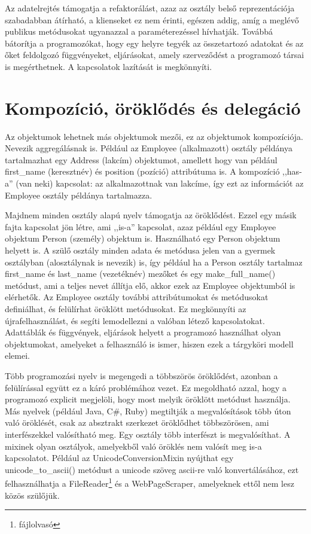 \documentclass[a4paper,12pt,twoside]{report}
\theoremstyle{definition}
\begin{document}
	Az adatelrejtés támogatja a refaktorálást, azaz az osztály belső reprezentációja szabadabban átírható, a klienseket ez nem érinti, egészen addig, amíg a meglévő publikus metódusokat ugyanazzal a paraméterezéssel hívhatják. Továbbá bátorítja a programozókat, hogy egy helyre tegyék az összetartozó adatokat és az őket feldolgozó függvényeket, eljárásokat, amely szerveződést a programozó társai is megérthetnek. A kapcsolatok lazítását is megkönnyíti.
	
	\section{Kompozíció, öröklődés és delegáció}
	Az objektumok lehetnek más objektumok mezői, ez az objektumok kompozíciója. Nevezik aggregálásnak is. Például az Employee (alkalmazott) osztály példánya tartalmazhat egy Address (lakcím) objektumot, amellett hogy van például first\_name (keresztnév) és position (pozíció) attribútuma is. A kompozíció ,,has-a'' (van neki) kapcsolat: az alkalmazottnak van lakcíme, így ezt az információt az Employee osztály példánya tartalmazza.
	
	Majdnem minden osztály alapú nyelv támogatja az öröklődést. Ezzel egy másik fajta kapcsolat jön létre, ami ,,is-a'' kapcsolat, azaz például egy Employee objektum Person (személy) objektum is. Használható egy Person objektum helyett is. A szülő osztály minden adata és metódusa jelen van a gyermek osztályban (alosztálynak is nevezik) is, így például ha a Person osztály tartalmaz first\_name és last\_name (vezetéknév) mezőket és egy make\_full\_name() metódust, ami a teljes nevet állítja elő, akkor ezek az Employee objektumból is elérhetők. Az Employee osztály további attribútumokat és metódusokat definiálhat, és felülírhat öröklött metódusokat. Ez megkönnyíti az újrafelhasználást, és segíti lemodellezni a valóban létező kapcsolatokat. Adattáblák és függvények, eljárások helyett a programozó használhat olyan objektumokat, amelyeket a felhasználó is ismer, hiszen ezek a tárgyköri modell elemei.\cite{Jacobsen}
	
	Több programozási nyelv is megengedi a többszörös öröklődést, azonban a felülírással együtt ez a káró problémához vezet. Ez megoldható azzal, hogy a programozó explicit megjelöli, hogy most melyik öröklött metódust használja. Más nyelvek (például Java, C\#, Ruby) megtiltják a megvalósítások több úton való öröklését, csak az absztrakt szerkezet öröklődhet többszörösen, ami interfészekkel valósítható meg. Egy osztály több interfészt is megvalósíthat. A mixinek olyan osztályok, amelyekből való öröklés nem valósít meg is-a kapcsolatot. Például az UnicodeConversionMixin nyújthat egy unicode\_to\_ascii() metódust a unicode szöveg ascii-re való konvertálásához, ezt felhasználhatja a FileReader\footnote{fájlolvasó} és a WebPageScraper, amelyeknek ettől nem lesz közös szülőjük.
	
\end{document}
